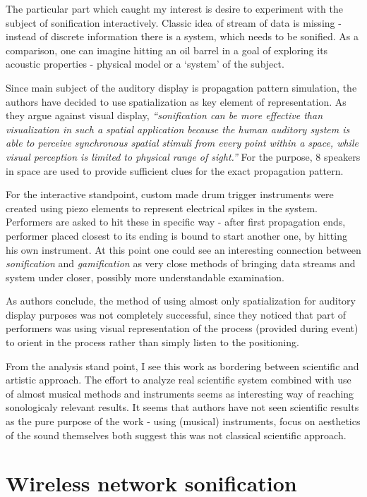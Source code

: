 \documentclass[12pt,a4paper,oneside]{report}
\begin{document}
The particular part which caught my interest is desire to experiment with the subject of sonification interactively. Classic idea of stream of data is missing - instead of discrete information there is a system, which needs to be sonified. As a comparison, one can imagine hitting an oil barrel in a goal of exploring its acoustic properties - physical model or a `system' of the subject.

Since main subject of the auditory display is propagation pattern simulation, the authors have decided to use spatialization as key element of representation. As they argue against visual display, \emph{``sonification can be more effective than visualization in such a spatial application because the human auditory system is able to perceive synchronous spatial stimuli from every point within a space, while visual perception is limited to physical range of sight.''} For the purpose, 8 speakers in space are used to provide sufficient clues for the exact propagation pattern.

For the interactive standpoint, custom made drum trigger instruments were created using piezo elements to represent electrical spikes in the system. Performers are asked to hit these in specific way - after first propagation ends, performer placed closest to its ending is bound to start another one, by hitting his own instrument. At this point one could see an interesting connection between \emph{sonification} and \emph{gamification} as very close methods of bringing data streams and system under closer, possibly more understandable examination.

As authors conclude, the method of using almost only spatialization for auditory display purposes was not completely successful, since they noticed that part of performers was using visual representation of the process (provided during event) to orient in the process rather than simply listen to the positioning. 

From the analysis stand point, I see this work as bordering between scientific and artistic approach. The effort to analyze real scientific system combined with use of almost musical methods and instruments seems as interesting way of reaching sonologicaly relevant results. It seems that authors have not seen scientific results as the pure purpose of the work - using (musical) instruments, focus on aesthetics of the sound themselves both suggest this was not classical scientific approach.

\section{Wireless network sonification}
\end{document}
